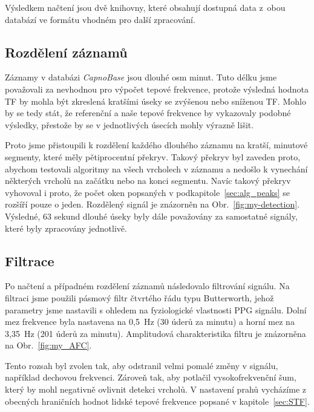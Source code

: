 Výsledkem načtení jsou dvě knihovny, které obsahují dostupná data z~obou databází ve formátu vhodném pro další zpracování.

\subsection*{Rozdělení záznamů}
\label{sec:alg_split}
Záznamy v databázi \emph{CapnoBase} jsou dlouhé osm minut.
Tuto délku jsme považovali za nevhodnou pro výpočet tepové frekvence, protože výsledná hodnota TF by mohla být zkreslená kratšími úseky se zvýšenou nebo sníženou TF.
Mohlo by se tedy stát, že referenční a naše tepové frekvence by vykazovaly podobné výsledky, přestože by se v jednotlivých úsecích mohly výrazně lišit.

Proto jsme přistoupili k rozdělení každého dlouhého záznamu na kratší, minutové segmenty, které měly pětiprocentní překryv.
Takový překryv byl zaveden proto, abychom testovali algoritmy na všech vrcholech v záznamu a nedošlo k vynechání některých vrcholů na začátku nebo na konci segmentu.
Navíc takový překryv vyhovoval i proto, že počet oken popsaných v podkapitole~\ref{sec:alg_peaks} se rozšíří pouze o jeden.
Rozdělený signál je znázorněn na Obr.~\ref{fig:my-detection}.
Výsledné, 63 sekund dlouhé úseky byly dále považovány za samostatné signály, které byly zpracovány jednotlivě.

\subsection*{Filtrace}
\label{sec:alg_filter}
Po načtení a případném rozdělení záznamů následovalo filtrování signálu.
Na filtraci jsme použili pásmový filtr čtvrtého řádu typu Butterworth, jehož parametry jsme nastavili s ohledem na fyziologické vlastnosti PPG signálu.
Dolní mez frekvence byla nastavena na 0,5~Hz (30 úderů za minutu) a horní mez na 3,35~Hz (201 úderů za minutu).
Amplitudová charakteristika filtru je znázorněna na Obr.~\ref{fig:my_AFC}.

Tento rozsah byl zvolen tak, aby odstranil velmi pomalé změny v signálu, například dechovou frekvenci. Zároveň tak, aby potlačil vysokofrekvenční šum, který by mohl negativně ovlivnit detekci vrcholů.
V nastavení prahů vycházíme z obecných hraničních hodnot lidské tepové frekvence popsané v kapitole~\ref{sec:STF}.

